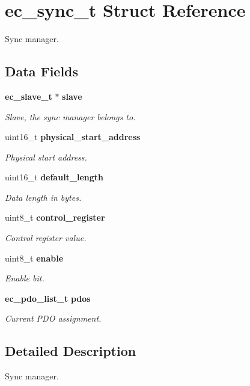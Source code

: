 \section{ec\-\_\-sync\-\_\-t \-Struct \-Reference}
\label{structec__sync__t}


\-Sync manager.  


\subsection*{\-Data \-Fields}
\begin{DoxyCompactItemize}
\item 
{\bf ec\-\_\-slave\-\_\-t} $\ast$ {\bf slave}
\begin{DoxyCompactList}\small\item\em \-Slave, the sync manager belongs to. \end{DoxyCompactList}\item 
uint16\-\_\-t {\bf physical\-\_\-start\-\_\-address}
\begin{DoxyCompactList}\small\item\em \-Physical start address. \end{DoxyCompactList}\item 
uint16\-\_\-t {\bf default\-\_\-length}
\begin{DoxyCompactList}\small\item\em \-Data length in bytes. \end{DoxyCompactList}\item 
uint8\-\_\-t {\bf control\-\_\-register}
\begin{DoxyCompactList}\small\item\em \-Control register value. \end{DoxyCompactList}\item 
uint8\-\_\-t {\bf enable}
\begin{DoxyCompactList}\small\item\em \-Enable bit. \end{DoxyCompactList}\item 
{\bf ec\-\_\-pdo\-\_\-list\-\_\-t} {\bf pdos}
\begin{DoxyCompactList}\small\item\em \-Current \-P\-D\-O assignment. \end{DoxyCompactList}\end{DoxyCompactItemize}


\subsection{\-Detailed \-Description}
\-Sync manager. 

